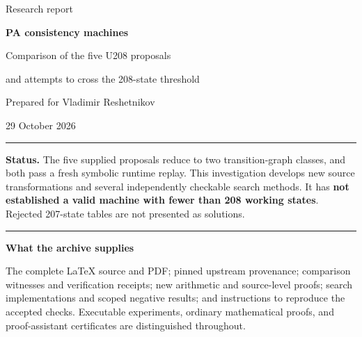 \documentclass[11pt,a4paper]{article}
\begin{document}
\hypersetup{pageanchor=false}
\begin{titlepage}
\vspace*{15mm}
{\color{accent}\Large Research report}\par\vspace{6mm}
{\color{ink}\Huge\bfseries PA consistency machines}\par\vspace{5mm}
{\color{ink}\LARGE Comparison of the five U208 proposals\par and attempts to cross the 208-state threshold}\par
\vspace{12mm}
\large Prepared for Vladimir Reshetnikov\par
29 October 2026\normalsize
\vspace{12mm}
\hrule\vspace{5mm}
\textbf{Status.} The five supplied proposals reduce to two transition-graph
classes, and both pass a fresh symbolic runtime replay. This investigation
develops new source transformations and several independently checkable
search methods. It has \textbf{not established a valid machine with fewer than
208 working states}. Rejected 207-state tables are not presented as solutions.
\vspace{5mm}\hrule
\vfill
\textbf{What the archive supplies}\par
The complete \LaTeX{} source and PDF; pinned upstream provenance; comparison
witnesses and verification receipts; new arithmetic and source-level proofs;
search implementations and scoped negative results; and instructions to
reproduce the accepted checks. Executable experiments, ordinary mathematical
proofs, and proof-assistant certificates are distinguished throughout.
\end{titlepage}
\hypersetup{pageanchor=true}
\end{document}
